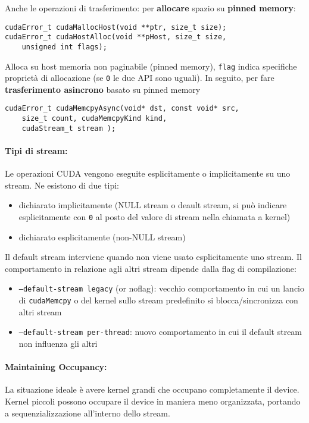 Anche le operazioni di trasferimento: per \textbf{allocare} spazio su \textbf{pinned memory}:
\begin{verbatim}
cudaError_t cudaMallocHost(void **ptr, size_t size);
cudaError_t cudaHostAlloc(void **pHost, size_t size, 
	unsigned int flags);
\end{verbatim}

Alloca su host memoria non paginabile (pinned memory), \texttt{flag} indica specifiche proprietà di allocazione (se \texttt{0} le due API sono uguali). In seguito, per fare \textbf{trasferimento asincrono} basato su pinned memory
\begin{verbatim}
cudaError_t cudaMemcpyAsync(void* dst, const void* src, 
	size_t count, cudaMemcpyKind kind, 
	cudaStream_t stream );
\end{verbatim}

\paragraph{Tipi di stream:} Le operazioni CUDA vengono eseguite esplicitamente o implicitamente su uno stream. Ne esistono di due tipi: 
\begin{itemize}
	\item dichiarato implicitamente (NULL stream o deault stream, si può indicare esplicitamente con \texttt{0} al posto del valore di stream nella chiamata a kernel)
	
	\item dichiarato esplicitamente (non-NULL stream)
\end{itemize}

Il default stream interviene quando non viene usato esplicitamente uno stream. Il comportamento in relazione agli altri stream dipende dalla flag di compilazione:
\begin{itemize}
	\item \texttt{--default-stream legacy} (or noflag): vecchio comportamento in cui un lancio di \texttt{cudaMemcpy} o del kernel sullo stream predefinito si blocca/sincronizza con altri stream
	
	\item \texttt{--default-stream per-thread}: nuovo comportamento in cui il default stream non influenza gli altri
\end{itemize}

\paragraph{Maintaining Occupancy:} La situazione ideale è avere kernel grandi che occupano completamente il device. Kernel piccoli possono occupare il device in maniera meno organizzata, portando a sequenzializzazione all'interno dello stream.

